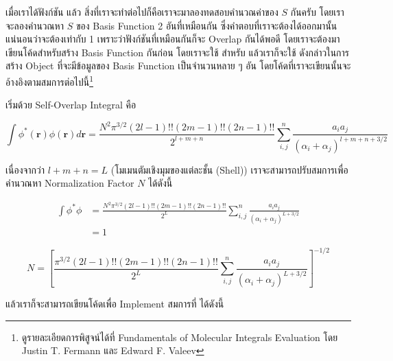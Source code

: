 \vspace{5pt}

เมื่อเราได้ฟังก์ชัน  แล้ว สิ่งที่เราจะทำต่อไปก็คือเราจะมาลองทดสอบคำนวณค่าของ $S$ กันครับ โดยเราจะลองคำนวณหา $S$
ของ Basis Function 2 อันที่เหมือนกัน ซึ่งคำตอบที่เราจะต้องได้ออกมานั้นแน่นอนว่าจะต้องเท่ากับ 1 เพราะว่าฟังก์ชันที่เหมือนกันก็จะ Overlap
กันได้พอดี โดยเราจะต้องมาเขียนโค้ดสำหรับสร้าง Basis Function กันก่อน โดยเราจะใช้  สำหรับ 
แล้วเราก็จะใช้  ดังกล่าวในการสร้าง Object ที่จะมีข้อมูลของ  Basis Function เป็นจำนวนหลาย ๆ อัน
โดยโค้ดที่เราจะเขียนนั้นจะอ้างอิงตามสมการต่อไปนี้\footnote{ดูรายละเอียดการพิสูจน์ได้ที่ Fundamentals of Molecular Integrals Evaluation 
โดย Justin T. Fermann และ Edward F. Valeev\autocite{fermann2020}}

เริ่มด้วย Self-Overlap Integral คือ

\begin{equation}
  \int \phi^*(\mathbf{r}) \phi(\mathbf{r}) d \mathbf{r}
  =
  \frac{N^2 \pi^{3 / 2}(2 l-1) ! !(2 m-1) ! !(2 n-1) ! !}{2^{l+m+n}}
  \sum_{i, j}^n \frac{a_i a_j}{\left(\alpha_i+\alpha_j\right)^{l+m+n+3 / 2}}
\end{equation}

\noindent เนื่องจากว่า $l + m + n = L$ (โมเมนตัมเชิงมุมของแต่ละชั้น (Shell)) เราจะสามารถปรับสมการเพื่อคำนวณหา Normalization
Factor $N$ ได้ดังนี้

\begin{align}
  \int \phi^* \phi
   & =
  \frac{N^2 \pi^{3 / 2}(2 l-1) ! !(2 m-1) ! !(2 n-1) ! !}{2^L}
  \sum_{i, j}^n \frac{a_i a_j}{\left(\alpha_i+\alpha_j\right)^{L+3 / 2}} \\
   & =
  1
\end{align}

\begin{equation}
  N
  =
  \left[
    \frac{\pi^{3 / 2}(2 l-1) ! !(2 m-1) ! !(2 n-1) ! !}{2^L}
    \sum_{i, j}^n \frac{a_i a_j}{\left(\alpha_i+\alpha_j\right)^{L+3 / 2}}
    \right]^{-1 / 2}
\end{equation}

\noindent แล้วเราก็จะสามารถเขียนโค้ดเพื่อ Implement สมการที่ ได้ดังนี้

\vspace{5pt}

